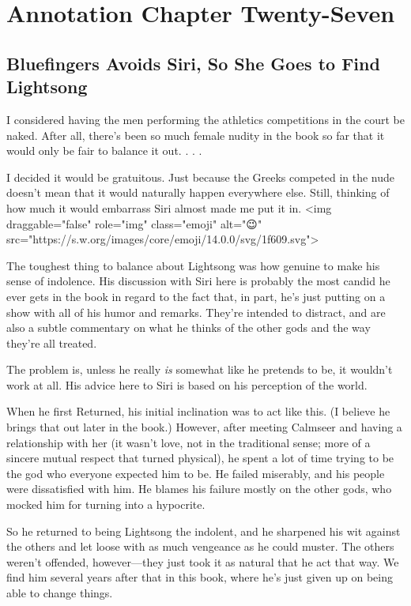 \section{Annotation Chapter Twenty-Seven}

\subsection*{Bluefingers Avoids Siri, So She Goes to Find Lightsong}

I considered having the men performing the athletics competitions in the court be naked. After all, there’s been so much female nudity in the book so far that it would only be fair to balance it out. . . .

I decided it would be gratuitous. Just because the Greeks competed in the nude doesn’t mean that it would naturally happen everywhere else. Still, thinking of how much it would embarrass Siri almost made me put it in. <img draggable="false" role="img" class="emoji" alt="😉" src="https://s.w.org/images/core/emoji/14.0.0/svg/1f609.svg">

The toughest thing to balance about Lightsong was how genuine to make his sense of indolence. His discussion with Siri here is probably the most candid he ever gets in the book in regard to the fact that, in part, he’s just putting on a show with all of his humor and remarks. They’re intended to distract, and are also a subtle commentary on what he thinks of the other gods and the way they’re all treated.

The problem is, unless he really \textit{is} somewhat like he pretends to be, it wouldn’t work at all. His advice here to Siri is based on his perception of the world.

When he first Returned, his initial inclination was to act like this. (I believe he brings that out later in the book.) However, after meeting Calmseer and having a relationship with her (it wasn’t love, not in the traditional sense; more of a sincere mutual respect that turned physical), he spent a lot of time trying to be the god who everyone expected him to be. He failed miserably, and his people were dissatisfied with him. He blames his failure mostly on the other gods, who mocked him for turning into a hypocrite.

So he returned to being Lightsong the indolent, and he sharpened his wit against the others and let loose with as much vengeance as he could muster. The others weren’t offended, however—they just took it as natural that he act that way. We find him several years after that in this book, where he’s just given up on being able to change things.



